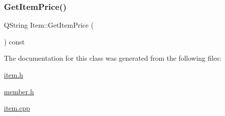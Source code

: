 \subsubsection{\texorpdfstring{Get\+Item\+Price()}{GetItemPrice()}\hspace{0.1cm}{\footnotesize\ttfamily [2/2]}}
{\footnotesize\ttfamily Q\+String Item\+::\+Get\+Item\+Price (\begin{DoxyParamCaption}{ }\end{DoxyParamCaption}) const}



The documentation for this class was generated from the following files\+:\begin{DoxyCompactItemize}
\item 
\hyperlink{item_8h}{item.\+h}\item 
\hyperlink{member_8h}{member.\+h}\item 
\hyperlink{item_8cpp}{item.\+cpp}\end{DoxyCompactItemize}
